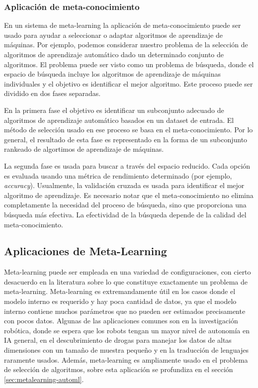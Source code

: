 \subsubsection{Aplicación de meta-conocimiento}

En un sistema de meta-learning la aplicación de meta-conocimiento puede ser usado para ayudar a seleccionar o adaptar algoritmos de aprendizaje de máquinas. Por ejemplo, podemos considerar nuestro problema de la selección de algoritmos de aprendizaje automático dado un determinado conjunto de algoritmos. El problema puede ser visto como un problema de búsqueda, donde el espacio de búsqueda incluye los algoritmos de aprendizaje de máquinas individuales y el objetivo es identificar el mejor algoritmo. Este proceso puede ser dividido en dos fases separadas.

En la primera fase el objetivo es identificar un subconjunto adecuado de algoritmos de aprendizaje automático basados en un dataset de entrada. El método de selección usado en ese proceso se basa en el meta-conocimiento. Por lo general, el resultado de esta fase es representado en la forma de un subconjunto rankeado de algortimos de aprendizaje de máquinas.

La segunda fase es usada para buscar a través del espacio reducido. Cada opción es evaluada usando una métrica de rendimiento determinado (por ejemplo, \textit{accuracy}). Usualmente, la validación cruzada es usada para identificar el mejor algoritmo de aprendizaje. Es necesario notar que el meta-conocimiento no elimina completamente la necesidad del proceso de búsqueda, sino que proporciona una búsqueda más efectiva. La efectividad de la búsqueda depende de la calidad del meta-conocimiento.


\subsection{Aplicaciones de Meta-Learning}\label{subsec:mtl_aplications}

Meta-learning puede ser empleada en una variedad de configuraciones, con cierto desacuerdo en la literatura sobre lo que constituye exactamente un problema de meta-learning. Meta-learning es extremandamente útil en los casos donde el modelo interno es requerido y hay poca cantidad de datos, ya que el modelo interno contiene muchos parámetros que no pueden ser estimados precisamente con pocos datos. Algunas de las aplicaciones comunes son en la investigación robótica, donde se espera que los robots tengan un mayor nivel de autonomía en IA general, en el descubrimiento de drogas para manejar los datos de altas dimensiones con un tamaño de muestra pequeño y en la traducción de lenguajes raramente usados. Además, meta-learning es ampliamente usado en el problema de selección de algoritmos, sobre esta aplicación se profundiza en el sección \ref{sec:metalearning-automl}.


